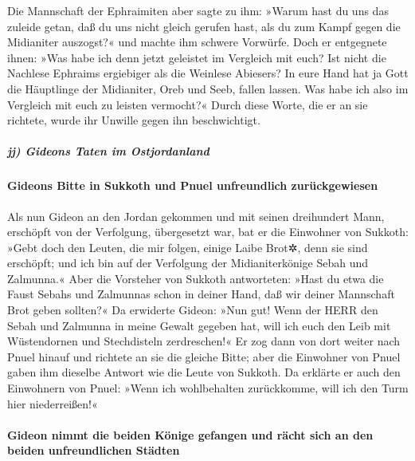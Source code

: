 Die Mannschaft der Ephraimiten aber sagte zu ihm: »Warum
hast du uns das zuleide getan, daß du uns nicht gleich gerufen hast, als
du zum Kampf gegen die Midianiter auszogst?« und machte ihm schwere
Vorwürfe. Doch er entgegnete ihnen: »Was habe ich denn
jetzt geleistet im Vergleich mit euch? Ist nicht die Nachlese Ephraims
ergiebiger als die Weinlese Abiesers? In eure Hand hat ja
Gott die Häuptlinge der Midianiter, Oreb und Seeb, fallen lassen. Was
habe ich also im Vergleich mit euch zu leisten vermocht?« Durch diese
Worte, die er an sie richtete, wurde ihr Unwille gegen ihn
beschwichtigt.

\hypertarget{jj-gideons-taten-im-ostjordanland}{%
\subparagraph{jj) Gideons Taten im
Ostjordanland}\label{jj-gideons-taten-im-ostjordanland}}

\hypertarget{gideons-bitte-in-sukkoth-und-pnuel-unfreundlich-zuruxfcckgewiesen}{%
\paragraph{Gideons Bitte in Sukkoth und Pnuel unfreundlich
zurückgewiesen}\label{gideons-bitte-in-sukkoth-und-pnuel-unfreundlich-zuruxfcckgewiesen}}

Als nun Gideon an den Jordan gekommen und mit seinen
dreihundert Mann, erschöpft von der Verfolgung, übergesetzt war,
bat er die Einwohner von Sukkoth: »Gebt doch den Leuten,
die mir folgen, einige Laibe Brot✲, denn sie sind erschöpft; und ich bin
auf der Verfolgung der Midianiterkönige Sebah und Zalmunna.«
Aber die Vorsteher von Sukkoth antworteten: »Hast du etwa
die Faust Sebahs und Zalmunnas schon in deiner Hand, daß wir deiner
Mannschaft Brot geben sollten?« Da erwiderte Gideon: »Nun
gut! Wenn der HERR den Sebah und Zalmunna in meine Gewalt gegeben hat,
will ich euch den Leib mit Wüstendornen und Stechdisteln zerdreschen!«
Er zog dann von dort weiter nach Pnuel hinauf und richtete
an sie die gleiche Bitte; aber die Einwohner von Pnuel gaben ihm
dieselbe Antwort wie die Leute von Sukkoth. Da erklärte er
auch den Einwohnern von Pnuel: »Wenn ich wohlbehalten zurückkomme, will
ich den Turm hier niederreißen!«

\hypertarget{gideon-nimmt-die-beiden-kuxf6nige-gefangen-und-ruxe4cht-sich-an-den-beiden-unfreundlichen-stuxe4dten}{%
\paragraph{Gideon nimmt die beiden Könige gefangen und rächt sich an den
beiden unfreundlichen
Städten}\label{gideon-nimmt-die-beiden-kuxf6nige-gefangen-und-ruxe4cht-sich-an-den-beiden-unfreundlichen-stuxe4dten}}

